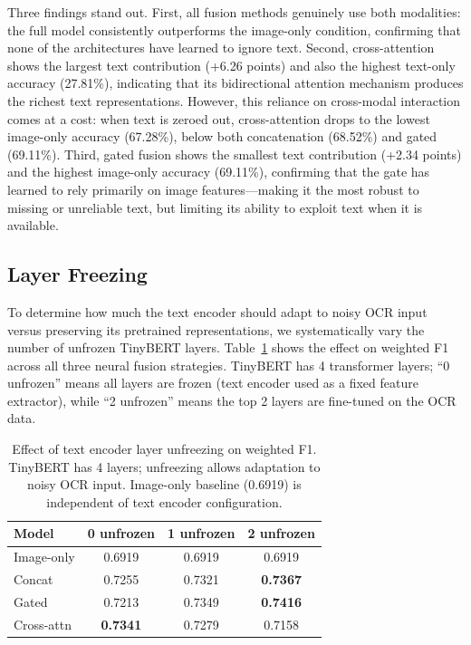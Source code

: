 \documentclass{article}
\begin{document}
Three findings stand out. First, all fusion methods genuinely use both modalities: the full model consistently outperforms the image-only condition, confirming that none of the architectures have learned to ignore text. Second, cross-attention shows the largest text contribution (+6.26 points) and also the highest text-only accuracy (27.81\%), indicating that its bidirectional attention mechanism produces the richest text representations. However, this reliance on cross-modal interaction comes at a cost: when text is zeroed out, cross-attention drops to the lowest image-only accuracy (67.28\%), below both concatenation (68.52\%) and gated (69.11\%). Third, gated fusion shows the smallest text contribution (+2.34 points) and the highest image-only accuracy (69.11\%), confirming that the gate has learned to rely primarily on image features---making it the most robust to missing or unreliable text, but limiting its ability to exploit text when it is available.

\subsection{Layer Freezing}

To determine how much the text encoder should adapt to noisy OCR input versus preserving its pretrained representations, we systematically vary the number of unfrozen TinyBERT layers. Table~\ref{tab:freezing} shows the effect on weighted F1 across all three neural fusion strategies. TinyBERT has 4 transformer layers; ``0 unfrozen'' means all layers are frozen (text encoder used as a fixed feature extractor), while ``2 unfrozen'' means the top 2 layers are fine-tuned on the OCR data.

\begin{table}[t]
\centering
\caption{Effect of text encoder layer unfreezing on weighted F1. TinyBERT has 4 layers; unfreezing allows adaptation to noisy OCR input. Image-only baseline (0.6919) is independent of text encoder configuration.}
\label{tab:freezing}
\small
\begin{tabular}{@{}lccc@{}}
\toprule
\textbf{Model} & \textbf{0 unfrozen} & \textbf{1 unfrozen} & \textbf{2 unfrozen} \\
\midrule
Image-only      & 0.6919 & 0.6919 & 0.6919 \\
Concat          & 0.7255 & 0.7321 & \textbf{0.7367} \\
Gated           & 0.7213 & 0.7349 & \textbf{0.7416} \\
Cross-attn      & \textbf{0.7341} & 0.7279 & 0.7158 \\
\bottomrule
\end{tabular}
\end{table}
\end{document}
